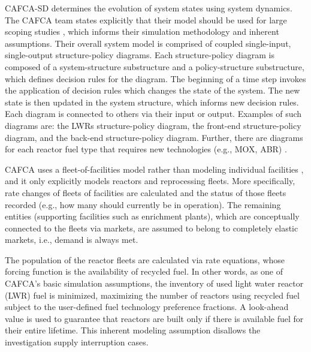 CAFCA-SD determines the evolution of system states using system dynamics. The
CAFCA team states explicitly that their model should be used for large scoping
studies \cite{guerin_impact_2009}, which informs their simulation methodology
and inherent assumptions. Their overall system model is comprised of coupled
single-input, single-output structure-policy diagrams. Each structure-policy
diagram is composed of a system-structure substructure and a policy-structure
substructure, which defines decision rules for the diagram. The beginning of a
time step invokes the application of decision rules which changes the state of
the system. The new state is then updated in the system structure, which informs
new decision rules. Each diagram is connected to others via their input or
output. Examples of such diagrams are: the LWRs structure-policy diagram, the
front-end structure-policy diagram, and the back-end structure-policy
diagram. Further, there are diagrams for each reactor fuel type that requires
new technologies (e.g., MOX,
ABR) \cite{busquim_e_silva_system_2008,guerin_impact_2009}.

CAFCA uses a fleet-of-facilities model rather than modeling individual
facilities \cite{guerin_impact_2009}, and it only explicitly models reactors and
reprocessing fleets. More specifically, rate changes of fleets of facilities are
calculated and the status of those fleets recorded (e.g., how many should
currently be in operation). The remaining entities (supporting facilities such
as enrichment plants), which are conceptually connected to the fleets via
markets, are assumed to belong to completely elastic markets, i.e., demand is
always met. 

The population of the reactor fleets are calculated via rate equations, whose
forcing function is the availability of recycled fuel. In other words, as one of
CAFCA's basic simulation assumptions, the inventory of used light water reactor
(LWR) fuel is minimized, maximizing the number of reactors using recycled fuel
subject to the user-defined fuel technology preference fractions. A look-ahead
value is used to guarantee that reactors are built only if there is available
fuel for their entire lifetime. This inherent modeling assumption disallows
the investigation supply interruption cases.

